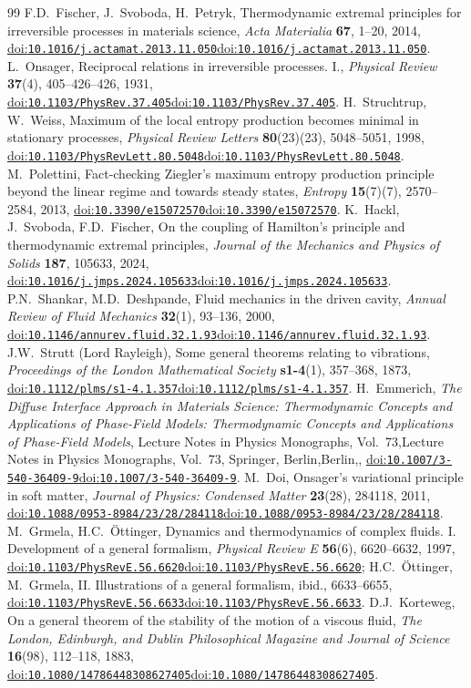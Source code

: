 \documentclass[12pt]{article}
\newif\ifhighlight \highlightfalse
\newif\ifhighlightfirst \highlightfirstfalse
\DeclareRobustCommand{\chg}[1]{\ifhighlight\ifhighlightfirst\textcolor{revised}{#1}\else#1\fi\else#1\fi}
\DeclareRobustCommand{\chgb}[1]{\ifhighlight\textcolor{revisedb}{#1}\else#1\fi}
\providecommand{\doi}[1]{\chg{\href{https://doi.org/#1}{doi:\nolinkurl{#1}}}}
\begin{document}
\begin{thebibliography}{99}
 F.D.~Fischer, J.~Svoboda, H.~Petryk, Thermodynamic extremal principles for irreversible processes in materials science, \textit{Acta Materialia} \textbf{67}, 1--20, 2014, \doi{10.1016/j.actamat.2013.11.050}.
 L.~Onsager, Reciprocal relations in irreversible processes. I., \textit{Physical Review} \textbf{37}(4), \chg{405--426}, 1931, \doi{10.1103/PhysRev.37.405}.
 H.~Struchtrup, W.~Weiss, Maximum of the local entropy production becomes minimal in stationary processes, \textit{Physical Review Letters} \textbf{80}\chg{(23)}, 5048--5051, 1998, \doi{10.1103/PhysRevLett.80.5048}.
 M.~Polettini, Fact-checking Ziegler's maximum entropy production principle beyond the linear regime and towards steady states, \textit{Entropy} \textbf{15}\chg{(7)}, 2570--2584, 2013, \doi{10.3390/e15072570}.
 K.~Hackl, J.~Svoboda, F.D.~Fischer, On the coupling of Hamilton's principle and thermodynamic extremal principles, \textit{Journal of the Mechanics and Physics of Solids} \textbf{187}, 105633, 2024, \doi{10.1016/j.jmps.2024.105633}.
 \chgb{P.N.~Shankar, M.D.~Deshpande, Fluid mechanics in the driven cavity, \textit{Annual Review of Fluid Mechanics} \textbf{32}(1), 93--136, 2000, \doi{10.1146/annurev.fluid.32.1.93}.}
 J.W.~Strutt (Lord Rayleigh), Some general theorems relating to vibrations, \textit{Proceedings of the London Mathematical Society} \textbf{s1-4}(1), 357--368, 1873, \doi{10.1112/plms/s1-4.1.357}.
 H.~Emmerich, \textit{The Diffuse Interface Approach in Materials Science\chg{: Thermodynamic Concepts and Applications of Phase-Field Models}}, \chg{Lecture Notes in Physics Monographs, Vol.~73,} Springer, \chg{Berlin,} 2003, \doi{10.1007/3-540-36409-9}.
 M.~Doi, Onsager's variational principle in soft matter, \textit{Journal of Physics: Condensed Matter} \textbf{23}(28), 284118, 2011, \doi{10.1088/0953-8984/23/28/284118}.
 M.~Grmela, H.C.~\"Ottinger, Dynamics and thermodynamics of complex fluids. I. Development of a general formalism, \textit{Physical Review E} \textbf{56}(6), 6620--6632, 1997, \doi{10.1103/PhysRevE.56.6620}; H.C.~\"Ottinger, M.~Grmela, II. Illustrations of a general formalism, ibid., 6633--6655, \doi{10.1103/PhysRevE.56.6633}.
 D.J.~Korteweg, On a general theorem of the stability of the motion of a viscous fluid, \textit{The London, Edinburgh, and Dublin Philosophical Magazine and Journal of Science} \textbf{16}(98), 112--118, 1883, \doi{10.1080/14786448308627405}.

\end{thebibliography}
\end{document}
